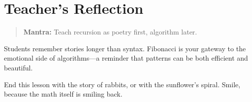 \section{Teacher’s Reflection}

\begin{quote}
\textbf{Mantra:} Teach recursion as poetry first, algorithm later.
\end{quote}

Students remember stories longer than syntax.  
Fibonacci is your gateway to the emotional side of algorithms—a reminder that
patterns can be both efficient and beautiful.

End this lesson with the story of rabbits, or with the sunflower’s spiral.
Smile, because the math itself is smiling back.

